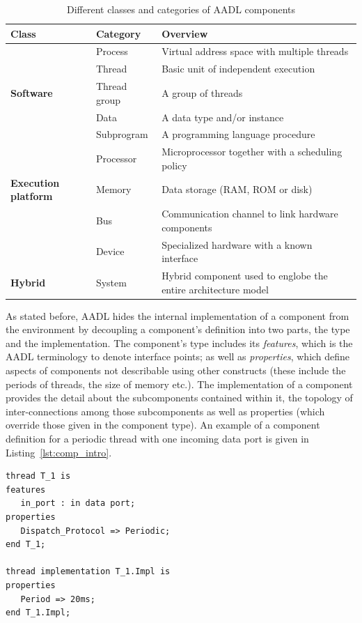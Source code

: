 \begin{table}
\centering
\begin{tabular}{|l|l|l|}
\hline
\textbf{Class} & \textbf{Category} & \textbf{Overview}\\
\hline
 & Process & Virtual address space with multiple threads\\
 & Thread & Basic unit of independent execution\\
\textbf{Software} & Thread group & A group of threads\\
 & Data & A data type and/or instance\\
 & Subprogram & A programming language procedure\\
\hline
 & Processor & Microprocessor together with a scheduling policy\\
\textbf{Execution platform} & Memory & Data storage (RAM, ROM or disk)\\
 & Bus & Communication channel to link hardware components\\
 & Device & Specialized hardware with a known interface\\
\hline
\textbf{Hybrid} & System & Hybrid component used to englobe the entire
architecture model\\
\hline
\end{tabular}
\caption{Different classes and categories of AADL components}
\label{tab:comp_cats}
\end{table}

As stated before, AADL hides the internal implementation of a
component from the environment by decoupling a component's definition
into two parts, the type and the implementation. The component's type
includes its \emph{features}, which is the AADL terminology to denote
interface points; as well as \emph{properties}, which define aspects
of components not describable using other constructs (these include
the periods of threads, the size of memory etc.). The implementation
of a component provides the detail about the subcomponents contained
within it, the topology of inter-connections among those subcomponents
as well as properties (which override those given in the component
type). An example of a component definition for a periodic thread with
one incoming data port is given in Listing~\ref{lst:comp_intro}.

\begin{minipage}{\listingwidth}
\lstset{language=ada,
  numbers=left,
  numberstyle=\tiny
}
\lstset{language=aadl}
\begin{lstlisting}[label=lst:comp_intro, caption=An AADL periodic
    thread with a period of 20 msec and one incoming data port]
thread T_1 is
features
   in_port : in data port;
properties
   Dispatch_Protocol => Periodic;
end T_1;

thread implementation T_1.Impl is
properties
   Period => 20ms;
end T_1.Impl;
\end{lstlisting}
\end{minipage}

